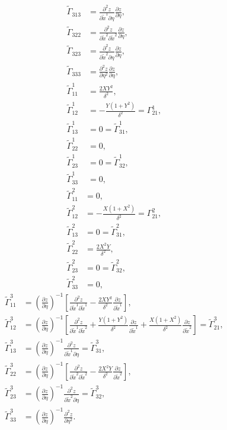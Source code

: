 \documentclass{article}
\begin{document}
\begin{align}
\tilde{\Gamma}_{313}&=\frac{\partial^2 z}{\partial \tilde{x}^1 \partial \eta}\frac{\partial z}{\partial \eta}, \\
\tilde{\Gamma}_{322}&=\frac{\partial^2 z}{\partial \tilde{x}^2 \partial \tilde{x}^2} \frac{\partial z}{\partial \eta}, \\
\tilde{\Gamma}_{323}&=\frac{\partial^2 z}{\partial \tilde{x}^2 \partial \eta}\frac{\partial z}{\partial \eta}, \\
\tilde{\Gamma}_{333}&=\frac{\partial^2 z}{\partial \eta^2}\frac{\partial z}{\partial \eta}, \\
\tilde{\Gamma}^1_{11}&=\frac{2 X Y^2 }{ \delta^2 }, \\
\tilde{\Gamma}^1_{12}&=-\frac{ Y(1 + Y^2) }{ \delta^2 }=\Gamma^1_{21}, \\
\tilde{\Gamma}^1_{13}&=0=\tilde{\Gamma}^1_{31}, \\
\tilde{\Gamma}^1_{22}&=0, \\
\tilde{\Gamma}^1_{23}&=0=\tilde{\Gamma}^1_{32}, \\
\tilde{\Gamma}^1_{33}&=0,
\end{align}
\begin{align}
\tilde{\Gamma}^2_{11}&=0, \\
\tilde{\Gamma}^2_{12}&=-\frac{X(1+X^2)}{\delta^2}=\Gamma^2_{21}, \\
\tilde{\Gamma}^2_{13}&=0=\tilde{\Gamma}^2_{31}, \\
\tilde{\Gamma}^2_{22}&=\frac{2X^2Y}{\delta^2}, \\
\tilde{\Gamma}^2_{23}&=0=\tilde{\Gamma}^2_{32}, \\
\tilde{\Gamma}^2_{33}&=0,
\end{align}
\begin{align}
\tilde{\Gamma}^3_{11}&=\left(\frac{\partial z}{\partial \eta}\right)^{-1}\left[ \frac{\partial^2 z}{\partial \tilde{x}^1 \partial \tilde{x}^1} - \frac{2 X Y^2 }{ \delta^2 } \frac{\partial z}{\partial \tilde{x}^1}\right], \\
\tilde{\Gamma}^3_{12}&=\left(\frac{\partial z}{\partial \eta}\right)^{-1}\left[ \frac{\partial^2 z}{\partial \tilde{x}^1 \partial \tilde{x}^2} + \frac{ Y(1 + Y^2) }{ \delta^2 } \frac{\partial z}{\partial \tilde{x}^1} + \frac{X(1+X^2)}{\delta^2} \frac{\partial z}{\partial \tilde{x}^2}   \right]=\tilde{\Gamma}^3_{21}, \\
\tilde{\Gamma}^3_{13}&=\left(\frac{\partial z}{\partial \eta}\right)^{-1} \frac{\partial^2 z}{\partial \tilde{x}^1 \partial \eta}=\tilde{\Gamma}^3_{31}, \\
\tilde{\Gamma}^3_{22}&=\left(\frac{\partial z}{\partial \eta}\right)^{-1}\left[ \frac{\partial^2 z}{\partial \tilde{x}^2 \partial \tilde{x}^2} - \frac{2 X^2 Y }{ \delta^2 } \frac{\partial z}{\partial \tilde{x}^2}\right], \\
\tilde{\Gamma}^3_{23}&=\left(\frac{\partial z}{\partial \eta}\right)^{-1} \frac{\partial^2 z}{\partial \tilde{x}^2 \partial \eta}=\tilde{\Gamma}^3_{32}, \\
\tilde{\Gamma}^3_{33}&=\left(\frac{\partial z}{\partial \eta}\right)^{-1} \frac{\partial^2 z}{\partial \eta^2}.
\end{align}
\end{document}
